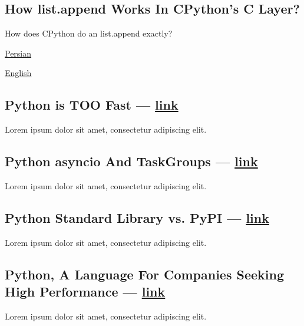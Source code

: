 \begin{multicols}{2}
\subsection{{How list.append Works In CPython's C Layer?}}
\begin{zitemize}
\item How does CPython do an {\ttfamily list.append} exactly?
\item \href{https://virgool.io/@liewpl/how-append-works-gp4apwtpr0bt}{Persian}
\item \href{https://medium.com/@mahdihaghverdi/how-list-append-is-implemented-in-c-layer-of-cpython-interpreter-bf88632819c0}{English}
\end{zitemize}

\subsection{{Python is TOO Fast --- \href{https://virgool.io/@liewpl/python-is-very-fast-gmmdjs3zyhob}{link}}}
\begin{zitemize}
\item Lorem ipsum dolor sit amet, consectetur adipiscing elit.
\end{zitemize}

\subsection{{Python asyncio And TaskGroups --- \href{https://virgool.io/@liewpl/asyncio-and-taskgroups-t598c8poken9}{link}}}
\begin{zitemize}
\item Lorem ipsum dolor sit amet, consectetur adipiscing elit.
\end{zitemize}

\subsection{{Python Standard Library vs. PyPI --- \href{https://virgool.io/@liewpl/asyncio-and-taskgroups-t598c8poken9}{link}}}
\begin{zitemize}
\item Lorem ipsum dolor sit amet, consectetur adipiscing elit.
\end{zitemize}

\subsection{{Python, A Language For Companies Seeking High Performance --- \href{https://vrgl.ir/29p56}{link}}}
\begin{zitemize}
\item Lorem ipsum dolor sit amet, consectetur adipiscing elit.
\end{zitemize}


\end{multicols}
